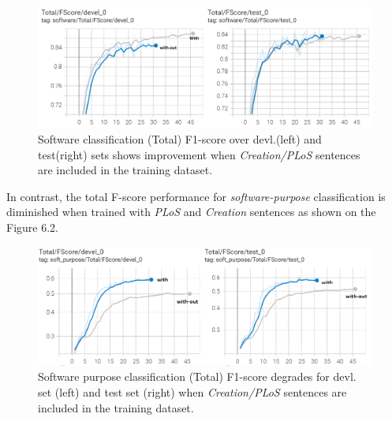 \begin{figure}[htbp]
	\centering
	\includegraphics[width=.86\textwidth]{4.graphics/figures/ch_6/1.with_sent_vs_without/HD/TotalFscoresoftware}
	\caption{Software classification (Total) F1-score over devl.(left) and test(right) sets shows improvement when \emph{Creation/PLoS} sentences are included in the training dataset.}
	\label{fig:chapter06:with}
\end{figure}


In contrast, the total F-score performance for \emph{software-purpose} classification is diminished when trained with \emph{PLoS} and \emph{Creation} sentences as shown on the Figure 6.2. \\

\begin{figure}[htbp]
	\centering
	\includegraphics[width=1\textwidth]{4.graphics/figures/ch_6/1.with_sent_vs_without/HD/Total_Fscore_software_purpose}
	\caption{Software purpose classification (Total) F1-score degrades for devl. set (left) and test set (right) when \emph{Creation/PLoS} sentences are included in the training dataset.}
	\label{fig:chapter06:withvswitout}
\end{figure}


